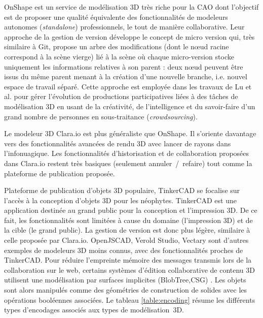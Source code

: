 OnShape est un service de modélisation \gls{3D} très riche pour la \gls{CAO} dont l'objectif est de 
proposer une qualité équivalente des fonctionnalités de modeleurs autonomes 
(\textit{standalone}) professionnels, le tout de manière collaborative. Leur approche 
de la gestion de version développe le concept de micro version \cite{Baran2015} qui, très 
similaire à Git, propose un arbre des modifications (dont le n\oe ud racine correspond à 
la scène vierge) lié à la scène où chaque micro-version stocke uniquement les informations relatives à son parent : deux n\oe ud peuvent être issus du même parent menant à la création d'une nouvelle branche, i.e. nouvel espace de travail séparé.
Cette approche est employée dans les travaux de Lu et al. \cite{Lu2016} pour 
gérer l'évolution de productions participatives liées à des tâches de modélisation 
3D en usant de la créativité, de l'intelligence et du savoir-faire 
d'un grand nombre de personnes en sous-traitance (\textit{crowdsourcing}). 

Le modeleur \gls{3D} Clara.io \cite{Houston2013} est plus généraliste que OnShape. Il s'oriente 
davantage vers des fonctionnalités avancées de rendu \gls{3D} avec lancer de rayons dans l'infonuagique. 
Les fonctionnalités d'historisation et de collaboration proposées 
dans Clara.io restent très basiques (seulement annuler~/~refaire) tout comme la plateforme de publication proposée. 

Plateforme de publication d'objets \gls{3D} populaire, TinkerCAD se focalise sur l'accès à la 
conception d'objets \gls{3D} pour les néophytes. TinkerCAD est une application destinée au grand 
public pour la conception et l'impression \gls{3D}. De ce fait, les fonctionnalités 
sont limitées à cause du domaine (l'impression \gls{3D}) et de la cible (le grand public). 
La gestion de version est donc plus légère, similaire à celle proposée par Clara.io. 
OpenJSCAD, Verold Studio, Vectary sont d'autres exemples de modeleurs \gls{3D} moins 
connus, avec des fonctionnalités proches de TinkerCAD.
Pour réduire l'empreinte mémoire des messages transmis lors de la collaboration 
sur le web, certains systèmes d'édition collaborative de contenu \gls{3D} utilisent 
une modélisation par surfaces implicites (BlobTree,\gls{CSG}) \cite{Grasberger2013}. 
Les objets sont alors manipulés comme des géométries de construction de 
solides avec les opérations booléennes associées. Le tableau \ref{table:encoding} 
résume les différents types 
d'encodages associés aux types de modélisation~3D. 

